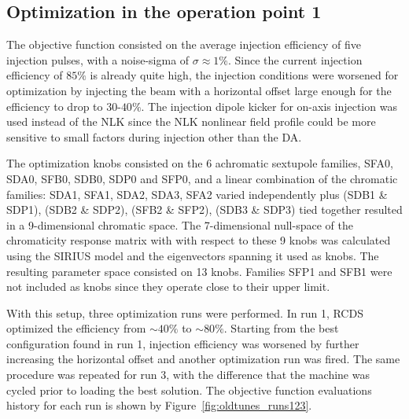 \documentclass[a4paper,
               keeplastbox,   %
               ]{jacow}
\begin{document}
\subsection{Optimization in the  operation point 1}
The objective function consisted on the average injection efficiency of five injection pulses, with a noise-sigma of $\sigma \approx 1\%$. Since the current injection efficiency of $85\%$ is already quite high, the injection conditions were worsened for optimization by injecting the beam with a horizontal offset large enough for the efficiency to drop to $30$-$40\%$. The injection dipole kicker for on-axis injection was used instead of the NLK since the NLK nonlinear field profile could be more sensitive to small factors during injection other than the DA. 

The optimization knobs consisted on the 6 achromatic sextupole families, SFA0, SDA0, SFB0, SDB0, SDP0 and SFP0, and a linear combination of the chromatic families: SDA1, SFA1, SDA2, SDA3, SFA2 varied independently plus (SDB1 \& SDP1), (SDB2 \& SDP2), (SFB2 \& SFP2), (SDB3 \& SDP3) tied together resulted in a 9-dimensional chromatic space. The 7-dimensional null-space of the chromaticity response matrix with with respect to these 9 knobs was calculated using the SIRIUS model and the eigenvectors spanning it used as knobs. The resulting parameter space consisted on 13 knobs. Families SFP1 and SFB1 were not included as knobs since they operate close to their upper limit.

With this setup, three optimization runs were performed. In run 1, RCDS optimized the efficiency from $\sim 40\%$ to $\sim 80\%$. Starting from the best configuration found in run 1, injection efficiency was worsened by further increasing the horizontal offset and another optimization run was fired. The same procedure was repeated for run 3, with the difference that the machine was cycled prior to loading the best solution. The objective function evaluations history for each run is shown by Figure~\ref{fig:oldtunes_runs123}.

\end{document}
